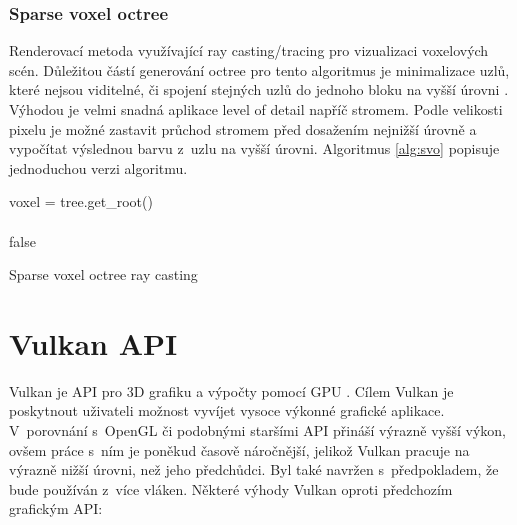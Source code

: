 \subsubsection{Sparse voxel octree}\label{svo_alg}
Renderovací metoda využívající ray casting/tracing pro vizualizaci voxelových scén. Důležitou částí generování octree pro tento algoritmus je minimalizace uzlů, které nejsou viditelné, či spojení stejných uzlů do jednoho bloku na vyšší úrovni \cite{Laine2011EfficientSV}. Výhodou je velmi snadná aplikace level of detail napříč stromem. Podle velikosti pixelu je možné zastavit průchod stromem před dosažením nejnižší úrovně a vypočítat výslednou barvu z~uzlu na vyšší úrovni. Algoritmus \ref{alg:svo} popisuje jednoduchou verzi algoritmu.

\begin{center}
	\begin{czechalgorithm}[H] \label{alg:svo}
		voxel = tree.get\_root()\\
		\\
		\KwRet false
		\caption{Sparse voxel octree ray casting}
	\end{czechalgorithm}
\end{center}

\section{Vulkan API}
Vulkan je API pro 3D grafiku a výpočty pomocí GPU \cite{vulkan_web}. Cílem Vulkan je poskytnout uživateli možnost vyvíjet vysoce výkonné grafické aplikace. V~porovnání s~OpenGL či podobnými staršími API přináší výrazně vyšší výkon, ovšem práce s~ním je poněkud časově náročnější, jelikož Vulkan pracuje na výrazně nižší úrovni, než jeho předchůdci. Byl také navržen s~předpokladem, že bude používán z~více vláken. Některé výhody Vulkan oproti předchozím grafickým API:

